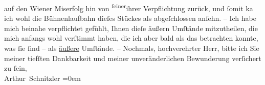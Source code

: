 \begin{ledgroupsized}[t]{13cm}
                    auf den Wiener Miserfolg hin von \substVorne{}\textsuperscript{ſeiner}{\allowbreak}\substDazwischen{}ihrer\substHinten{} Verpflichtung zurück, und ſomit ka{\geminationn} ich
                    wohl die Bühnenlaufbahn dieſes Stückes als abgeſchlossen anſehn. – Ich {\pb}habe mich beinahe verpflichtet gefühlt,
                    Ihnen dieſe äußern Umſtände mitzutheilen, die mich anfangs wohl verſtimmt haben,
                    die ich aber bald als das betrachten konnte, was ſie ſind – als \uline{äußere} Umſtände. –\pend
           \pstart
           Nochmals, hochverehrter Herr, bitte ich Sie meiner tiefſten Dankbarkeit und
                    meiner unveränderlichen Bewunderung verſichert zu ſein,{\\[\baselineskip]}\spacefill\mbox{Arthur Schnitzler}\pend
           \leftskip=0em{}\endnumbering{}\end{ledgroupsized}  \newcommand{\dateiname}{L00336}\newcommand{\titel}{Arthur Schnitzler an Georg Brandes, 12. 6. 1894}\newcommand{\editorInnen}{Martin Anton Müller und Gerd-Hermann Susen}
            \footnotesize
\begin{ledgroupsized}[t]{11.5cm}
\end{ledgroupsized}
         
      